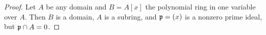 \begin{proof}
	Let $A$ be any domain and $B = A[x]$ the polynomial ring in one variable over $A$. Then $B$ is a domain, $A$ is a subring, and $\mathfrak{p} = (x)$ is a nonzero prime ideal, but $\mathfrak{p} \cap A = 0$.
\end{proof}
